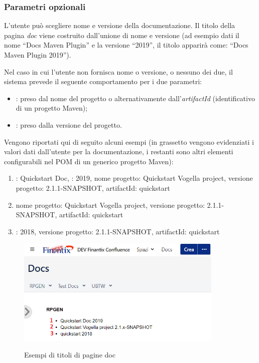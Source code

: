 	\subsubsection{Parametri opzionali} \label{parametriOpzionali}
	L'utente può scegliere nome e versione della documentazione.
	Il titolo della pagina \emph{doc} viene costruito dall'unione di nome e versione (ad esempio dati il nome ``Docs Maven Plugin'' e la versione ``2019'', il titolo apparirà come: ``Docs Maven Plugin 2019'').



	Nel caso in cui l'utente non fornisca nome o versione, o nessuno dei due, il sistema prevede il seguente comportamento per i due parametri:
	\begin{itemize}
		\item {}: preso dal nome del progetto o alternativamente dall'\emph{artifactId} (identificativo di un progetto Maven);
		\item {}: preso dalla versione del progetto.
	\end{itemize} 

	Vengono riportati qui di seguito alcuni esempi (in grassetto vengono evidenziati i valori dati dall'utente per la documentazione, i restanti sono altri elementi configurabili nel POM di un generico progetto Maven):
	\begin{enumerate}
		\item {}: Quickstart Doc,
		: 2019,
		 nome progetto: Quickstart Vogella project,  
		 versione progetto: 2.1.1-SNAPSHOT,
		 artifactId: quickstart
		\item nome progetto: Quickstart Vogella project, 
		 versione progetto: 2.1.1-SNAPSHOT, 
		  artifactId: quickstart
		\item {}: 2018,
		 versione progetto: 2.1.1-SNAPSHOT, 
		  artifactId: quickstart
	\end{enumerate}

	\begin{figure}[H]
		\centering
		\includegraphics[width=0.88\textwidth]{immagini/DocsExamples.png}\\
		\caption{Esempi di titoli di pagine doc}
		\label{screenDocsNameVersion}
	\end{figure}

